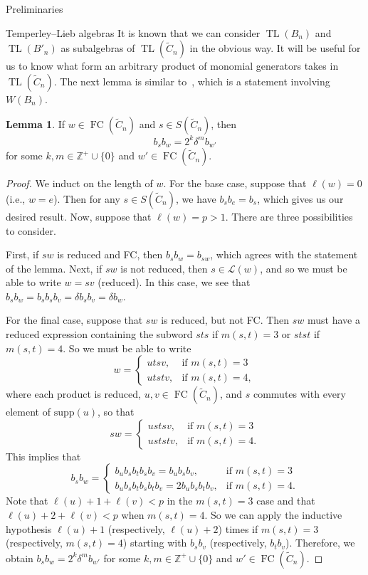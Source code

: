 \documentclass[11pt]{amsart}
\theoremstyle{definition}
\newtheorem{lemma}[theorem]{Lemma}
\numberwithin{equation}{section}
\newcommand{\Z}{\mathbb{Z}}
\newcommand{\C}{\widetilde{C}}
\DeclareMathOperator{\TL}{TL}
\newcommand{\supp}{\mathrm{supp}}
\renewcommand{\L}{\mathcal{L}}
\renewcommand{\(}{\left(}
\renewcommand{\)}{\right)}
\DeclareMathOperator{\FC}{FC}
\begin{document}
\begin{section}{Preliminaries}
\begin{subsection}{Temperley--Lieb algebras}
It is known that we can consider $\TL(B_{n})$ and $\TL(B'_{n})$ as subalgebras of $\TL(\C_{n})$ in the obvious way. It will be useful for us to know what form an arbitrary product of monomial generators takes in $\TL(\C_{n})$.  The next lemma is similar to~\cite[Lemma 2.1.3]{Green2000}, which is a statement involving $W(B_{n})$.

\begin{lemma}\label{lem:powers of 2 and delta monomials}
If $w \in \FC(\C_{n})$ and $s \in S(\C_{n})$, then
\[
b_{s}b_{w}=2^{k}\delta^{m}b_{w'}
\]
for some $k, m \in \Z^{+}\cup \{0\}$ and $w' \in \FC(\C_{n})$.
\end{lemma}

\begin{proof}
We induct on the length of $w$.  For the base case, suppose that $\ell(w)=0$ (i.e., $w=e$).  Then for any $s \in S(\C_{n})$, we have $b_{s}b_{e}=b_{s}$, which gives us our desired result.  Now, suppose that $\ell(w)=p>1$.  There are three possibilities to consider.  

First, if $sw$ is reduced and FC, then $b_{s}b_{w}=b_{sw}$, which agrees with the statement of the lemma. Next, if $sw$ is not reduced, then $s \in \L(w)$, and so we must be able to write $w=sv$ (reduced).  In this case, we see that $b_{s}b_{w}=b_{s}b_{s}b_{v}=\delta b_{s}b_{v}=\delta b_{w}$.

For the final case, suppose that $sw$ is reduced, but not FC.  Then $sw$ must have a reduced expression containing the subword $sts$ if $m(s,t)=3$ or $stst$ if $m(s,t)=4$.  So we must be able to write
\[
w=\begin{cases}
utsv, & \text{if } m(s,t)=3\\
utstv, & \text{if } m(s,t)=4,
\end{cases}
\]
where each product is reduced, $u, v \in \FC(\C_{n})$, and $s$ commutes with every element of $\supp(u)$, so that
\[
sw=\begin{cases}
ustsv, & \text{if } m(s,t)=3\\
uststv, & \text{if } m(s,t)=4.
\end{cases}
\]
This implies that
\[
b_{s}b_{w}=\begin{cases}
b_{u}b_{s}b_{t}b_{s}b_{v}=b_{u}b_{s}b_{v}, & \text{if } m(s,t)=3\\
b_{u}b_{s}b_{t}b_{s}b_{t}b_{v}=2b_{u}b_{s}b_{t}b_{v}, & \text{if } m(s,t)=4.
\end{cases}
\]
Note that $\ell(u)+1+\ell(v) < p$ in the $m(s,t)=3$ case and that $\ell(u)+2+\ell(v) < p$ when $m(s,t)=4$.  So we can apply the inductive hypothesis $\ell(u)+1$ (respectively, $\ell(u)+2$) times if $m(s,t)=3$ (respectively, $m(s,t)=4$) starting with $b_{s}b_{v}$ (respectively, $b_{t}b_{v}$).  Therefore, we obtain $b_{s}b_{w}=2^{k}\delta^{m}b_{w'}$ for some $k, m \in \Z^{+}\cup \{0\}$ and $w' \in \FC(\C_{n})$.
\end{proof}


\end{subsection}
\end{section}
\end{document}
